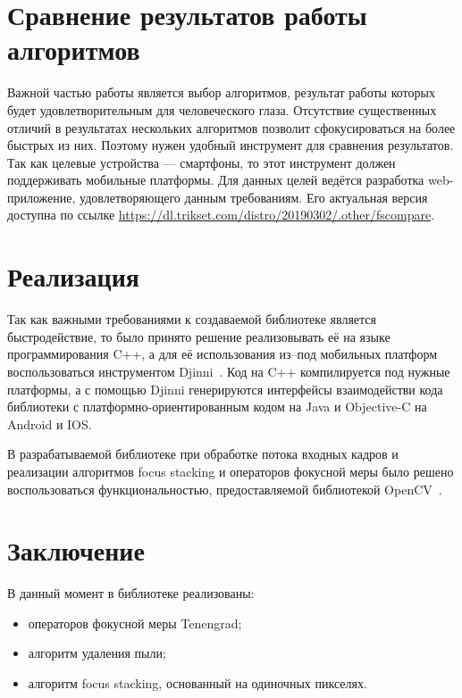 \documentclass[14pt]{matmex-diploma-custom}
\begin{document}
\section{Сравнение результатов работы алгоритмов}

Важной частью работы является выбор алгоритмов, результат работы которых будет удовлетворительным для человеческого глаза. Отсутствие существенных отличий в результатах нескольких алгоритмов позволит сфокусироваться на более быстрых из них. Поэтому нужен удобный инструмент для сравнения результатов. Так как целевые устройства --- смартфоны, то этот инструмент должен поддерживать мобильные платформы. Для данных целей ведётся разработка web-приложение, удовлетворяющего данным требованиям. Его актуальная версия доступна по ссылке \url{https://dl.trikset.com/distro/20190302/.other/fscompare}. 

\section{Реализация}

Так как важными требованиями к создаваемой библиотеке является быстродействие, то было принято решение реализовывать её на языке программирования C++, а для её использования из--под мобильных платформ воспользоваться инструментом Djinni~\cite{Djinni}. Код на C++ компилируется под нужные платформы, а с помощью Djinni генерируются интерфейсы взаимодействи кода библиотеки с платформно-ориентированным кодом на Java и Objective-C на Android и IOS. 
\par
В разрабатываемой библиотеке при обработке потока входных кадров и реализации алгоритмов focus stacking и операторов фокусной меры было решено воспользоваться функциональностью, предоставляемой библиотекой OpenCV~\cite{OpenCV}.

\section*{Заключение}
В данный момент в библиотеке реализованы:
\begin{itemize}
    \item операторов фокусной меры Tenengrad;
    \item алгоритм удаления пыли;
    \item алгоритм focus stacking, основанный на одиночных пикселях.
\end{itemize}
\end{document}
